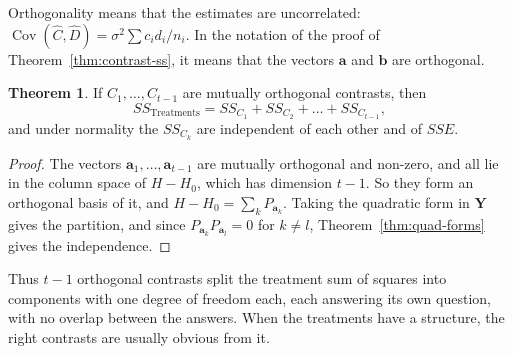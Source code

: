 \documentclass[11pt,a4paper]{article}
\numberwithin{equation}{section}
\DeclareMathOperator{\Cov}{Cov}
\theoremstyle{definition}
\newtheorem{thm}{Theorem}[subsection]
\begin{document}
Orthogonality means that the estimates are uncorrelated: $\Cov(\hat C, \hat D) = \sigma^2\sum c_id_i/n_i$. In the notation of the proof of Theorem~\ref{thm:contrast-ss}, it means
that the vectors $\mathbf a$ and $\mathbf b$ are orthogonal.

\begin{thm}\label{thm:orthogonal-partition}
If $C_1, \dots, C_{t-1}$ are mutually orthogonal contrasts, then
\[
SS_{\mathrm{Treatments}} = SS_{C_1} + SS_{C_2} + \dots + SS_{C_{t-1}} ,
\]
and under normality the $SS_{C_k}$ are independent of each other and of $SSE$.
\end{thm}

\begin{proof}
The vectors $\mathbf a_1, \dots, \mathbf a_{t-1}$ are mutually orthogonal and non-zero, and all lie in the column space of $H - H_0$, which has dimension $t - 1$. So they
form an orthogonal basis of it, and $H - H_0 = \sum_kP_{\mathbf a_k}$. Taking the quadratic form in $\mathbf Y$ gives the partition, and since $P_{\mathbf a_k}P_{\mathbf a_l} = 0$ for $k \ne l$,
Theorem~\ref{thm:quad-forms} gives the independence.
\end{proof}

Thus $t - 1$ orthogonal contrasts split the treatment sum of squares into components with one degree of freedom each, each answering its
own question, with no overlap between the answers. When the treatments have a structure, the right contrasts are usually obvious from it.
\end{document}
